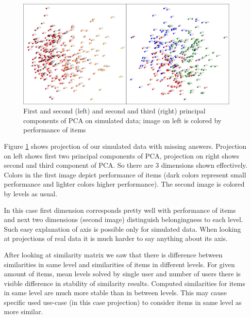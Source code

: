\documentclass[
  digital, %
  table,   %
  nolof,     %
  nolot,     %
  nocover,
  color,
  final, %
]{fithesis3}
\begin{document}

\begin{figure}
  \includegraphics[width=\textwidth]{img/simulated_missing}
  \caption{First and second (left) and second and third (right) principal components of PCA on simulated data; image on left is colored by performance of items}
  \label{fig:simulated_missing}
\end{figure}

Figure \ref{fig:simulated_missing} shows projection of our simulated data with missing answers. Projection on left shows first two principal components of PCA, projection on right shows second and third component of PCA. So there are 3 dimensions shown effectively. Colors in the first image depict performance of items (dark colors represent small performance and lighter colors higher performance). The second image is colored by levels as usual.

In this case first dimension corresponds pretty well with performance of items and next two dimensions (second image) distinguish belongingness to each level. Such easy explanation of axis is possible only for simulated data. When looking at projections of real data it is much harder to say anything about its axis.

After looking at similarity matrix we saw that there is difference between similarities in same level and similarities of items in different levels. For given amount of items, mean levels solved by single user and number of users there is visible difference in stability of similarity results. Computed similarities for items in same level are much more stable than in between levels. This may cause specific used use-case (in this case projection) to consider items in same level as more similar.
\end{document}
